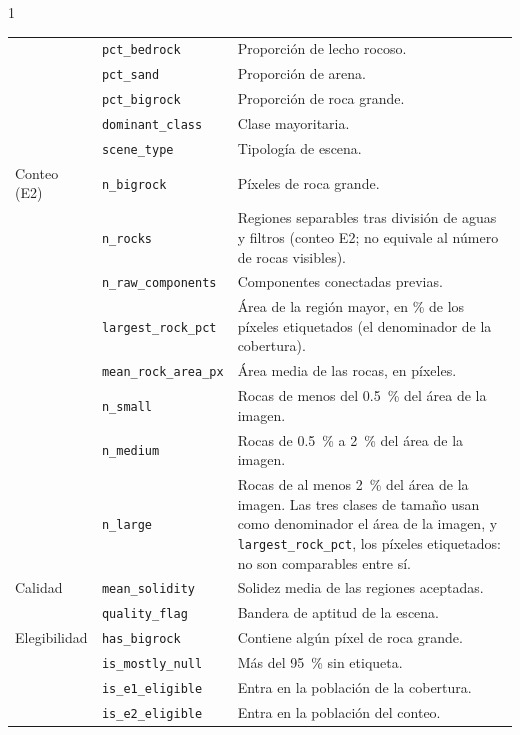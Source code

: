 \begin{spacing}{1}
\begin{longtable}{llp{7.2cm}}
                   & \texttt{pct\_bedrock}    & Proporción de lecho rocoso. \\
                   & \texttt{pct\_sand}       & Proporción de arena. \\
                   & \texttt{pct\_bigrock}    & Proporción de roca grande. \\
                   & \texttt{dominant\_class} & Clase mayoritaria. \\
                   & \texttt{scene\_type}     & Tipología de escena. \\
    \midrule
    Conteo (E2)    & \texttt{n\_bigrock}          & Píxeles de roca grande. \\
                   & \texttt{n\_rocks}            & Regiones separables tras división de aguas y filtros (conteo E2; no equivale al número de rocas visibles). \\
                   & \texttt{n\_raw\_components}  & Componentes conectadas previas. \\
                   & \texttt{largest\_rock\_pct}  & Área de la región mayor, en \% de los píxeles etiquetados (el denominador de la cobertura). \\
                   & \texttt{mean\_rock\_area\_px}& Área media de las rocas, en píxeles. \\
                   & \texttt{n\_small}            & Rocas de menos del \SI{0.5}{\percent} del área de la imagen. \\
                   & \texttt{n\_medium}           & Rocas de \SI{0.5}{\percent} a \SI{2}{\percent} del área de la imagen. \\
                   & \texttt{n\_large}            & Rocas de al menos \SI{2}{\percent} del área de la imagen. Las tres clases de tamaño usan como denominador el área de la imagen, y \texttt{largest\_rock\_pct}, los píxeles etiquetados: no son comparables entre sí. \\
    \midrule
    Calidad        & \texttt{mean\_solidity} & Solidez media de las regiones aceptadas. \\
                   & \texttt{quality\_flag}  & Bandera de aptitud de la escena. \\
    \midrule
    Elegibilidad   & \texttt{has\_bigrock}     & Contiene algún píxel de roca grande. \\
                   & \texttt{is\_mostly\_null} & Más del \SI{95}{\percent} sin etiqueta. \\
                   & \texttt{is\_e1\_eligible} & Entra en la población de la cobertura. \\
                   & \texttt{is\_e2\_eligible} & Entra en la población del conteo. \\
    \bottomrule
\end{longtable}
\end{spacing}


